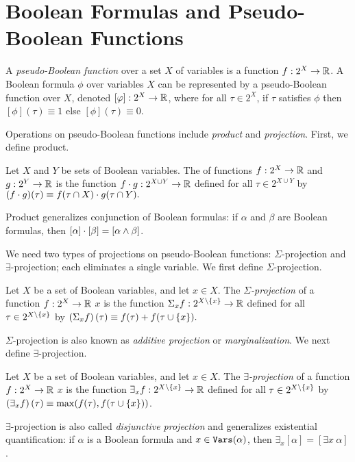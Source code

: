\section{Boolean Formulas and Pseudo-Boolean Functions}
A \emph{pseudo-Boolean function} over a set $X$ of variables is a function $f: 2^X \to \mathbb{R}$. A Boolean formula $\phi$ over variables $X$ can be represented by a pseudo-Boolean function over $X$, denoted $[\varphi]: 2^X \rightarrow \mathbb{R}$, where for all $\tau \in 2^X$, if $\tau$ satisfies $\phi$ then $[\phi](\tau) \equiv 1$ else $[\phi](\tau) \equiv 0$.

Operations on pseudo-Boolean functions include \emph{product} and \emph{projection}.
First, we define product.
\begin{definition}[Product]
\label{def_mult}
    Let $X$ and $Y$ be sets of Boolean variables.
    The  of functions $f: 2^X \to \mathbb{R}$ and $g: 2^Y \to \mathbb{R}$ is the function $f \cdot g: 2^{X \cup Y} \to \mathbb{R}$ defined for all $\tau \in 2^{X \cup Y}$ by
    $(f \cdot g)(\tau) \equiv f(\tau \cap X) \cdot g(\tau \cap Y).$
\end{definition}
Product generalizes conjunction of Boolean formulas: if $\alpha$ and $\beta$ are Boolean formulas, then $[\alpha] \cdot [\beta] = [\alpha \land \beta]$.

We need two types of projections on pseudo-Boolean functions: $\Sigma$-projection and $\exists$-projection; each eliminates a single variable. 
We first define $\Sigma$-projection.
\begin{definition}
\label{def_sum}
    Let $X$ be a set of Boolean variables, and let $x \in X$.
    The \emph{$\Sigma$-projection} of a function $f: 2^X \to \mathbb{R}$ \wrt{} $x$ is the function $\Sigma_x f: 2^{X \setminus \left\{ x \right\}} \to \mathbb{R}$ defined for all $\tau \in 2^{X \setminus \left\{ x \right\}}$ by
    $\left( \Sigma_x f \right)(\tau) \equiv f(\tau) + f(\tau \cup \left\{ x \right\}).$
\end{definition}
$\Sigma$-projection is also known as \emph{additive projection} or 
\emph{marginalization}.
We next define $\exists$-projection.
\begin{definition}
\label{def_exist}
    Let $X$ be a set of Boolean variables, and let $x \in X$.
    The \emph{$\exists$-projection} of a function $f: 2^X \to \mathbb{R}$ \wrt{} $x$ is the function $\exists_x f: 2^{X \setminus \left\{ x \right\}} \to \mathbb{R}$ defined for all $\tau \in 2^{X \setminus \left\{ x \right\}}$ by $\left( \exists_x f \right)(\tau) \equiv \max(f(\tau), f(\tau \cup \left\{ x \right\}))$.
\end{definition}
$\exists$-projection is also called \emph{disjunctive projection} and generalizes existential quantification: if $\alpha$ is a Boolean formula and $x \in \texttt{\upshape Vars}(\alpha)$, then $\exists_x [\alpha] = [\exists x ~ \alpha]$.

